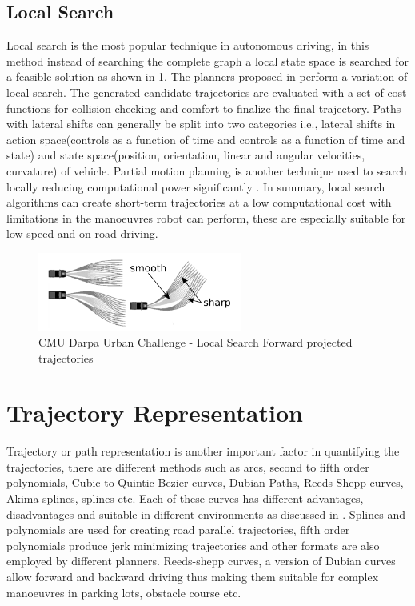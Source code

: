 \subsection{Local Search}
\label{rw_local_search}

Local search is the most popular technique in autonomous driving, in this method instead of searching the complete graph a local state space is searched for a feasible solution as shown in \ref{cmubossduc}. The planners proposed in \cite{darpa_urban_challenge} \cite{juniorstanford} \cite{kolski_thesis} \cite{Broggi2012} \cite{real_time_traj_plan_article} \cite{urbansafetyeth} perform a variation of local search. The generated candidate trajectories are evaluated with a set of cost functions for collision checking and comfort to finalize the final trajectory. Paths with lateral shifts can generally be split into two categories i.e., lateral shifts in action space(controls as a function of time and controls as a function of time and state) and state space(position, orientation, linear and angular velocities, curvature) of vehicle\cite{howard_phd}. Partial motion planning is another technique used to search locally reducing computational power significantly \cite{partialmotionplanning}. In summary, local search algorithms can create short-term trajectories at a low computational cost with limitations in the manoeuvres robot can perform, these are especially suitable for low-speed and on-road driving.

\begin{figure}
	\centering
	\includegraphics[width=0.6\textwidth]{Images/related_work/trajectorysetbossduc.png}
	\caption{CMU Darpa Urban Challenge - Local Search Forward projected trajectories}
	\label{cmubossduc}
\end{figure} 

\section{Trajectory Representation}
\label{trajrep}
Trajectory or path representation is another important factor in quantifying the trajectories, there are different methods such as arcs, second to fifth order polynomials, Cubic to Quintic Bezier curves, Dubian Paths, Reeds-Shepp curves, Akima splines, splines etc. Each of these curves has different advantages, disadvantages and suitable in different environments as discussed in \cite{motion_planning_techniques}. Splines and polynomials are used for creating road parallel trajectories, fifth order polynomials produce jerk minimizing trajectories\cite{werling_frenet} and other formats are also employed by different planners. Reeds-shepp curves, a version of Dubian curves allow forward and backward driving \cite{reedsshepp} thus making them suitable for complex manoeuvres in parking lots, obstacle course etc.


